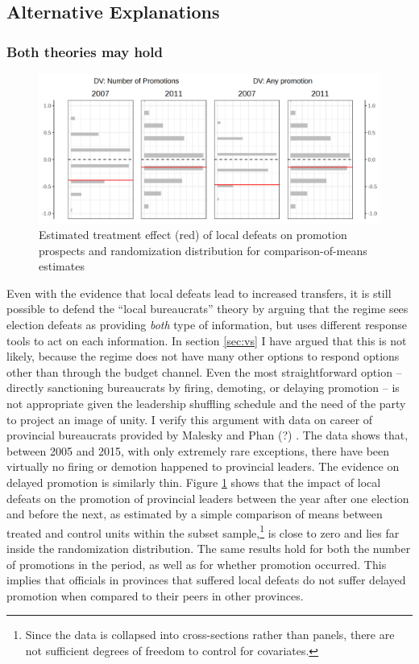 \documentclass[12pt]{article}\usepackage[]{graphicx}\usepackage[]{color}
\newcommand{\1}{\mathbbm{1}}
\begin{document}
\subsection{Alternative Explanations}

\subsubsection{Both theories may hold}

\begin{figure}[!htbp]
	\centering
	\includegraphics[width=\textwidth]{figure/SYP_RI_LEAD.png}
	\caption[Estimated effects of on promotion]{Estimated treatment effect (red) of local defeats on promotion prospects and randomization distribution for comparison-of-means estimates }
	\label{fig:Lead}
\end{figure}

Even with the evidence that local defeats lead to increased transfers, it is still possible to defend the ``local bureaucrats'' theory by arguing that the regime sees election defeats as providing \textit{both} type of information, but uses different response tools to act on each information. In section \ref{sec:vs} I have argued that this is not likely, because the regime does not have many other options to respond options other than through the budget channel. Even the most straightforward option -- directly sanctioning bureaucrats by firing, demoting, or delaying promotion -- is not appropriate given the leadership shuffling schedule and the need of the party to project an image of unity. I verify this argument with data on career of provincial bureaucrats provided by Malesky and Phan (?) \cite{MaleskyPhan}. The data shows that, between 2005 and 2015, with only extremely rare exceptions, there have been virtually no firing or demotion happened to provincial leaders. The evidence on delayed promotion is similarly thin. Figure \ref{fig:Lead} shows that the impact of local defeats on the promotion of provincial leaders between the year after one election and before the next, as estimated by a simple comparison of means between treated and control units within the subset sample,\footnote{Since the data is collapsed into cross-sections rather than panels, there are not sufficient degrees of freedom to control for covariates.} is close to zero and lies far inside the randomization distribution. The same results hold for both the number of promotions in the period, as well as for whether  promotion occurred. This implies that officials in provinces that suffered local defeats do not suffer delayed promotion when compared to their peers in other provinces.
\end{document}
